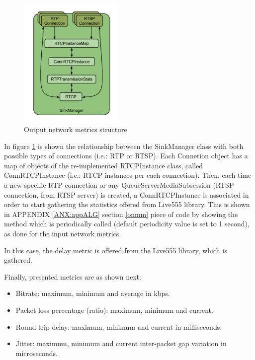 \begin{figure}[!htb]
\begin{center}
\includegraphics[width=0.45\textwidth]{./images/SinkManager.png}
\caption{Output network metrics structure}
\label{F:onms}
\end{center}
\end{figure}

In figure \ref{F:onms} is shown the relationship between the SinkManager class with both possible types of connections (i.e.: RTP or RTSP). Each Connetion object has a map of objects of the re-implemented RTCPInstance class, called ConnRTCPInstance (i.e.: RTCP instances per each connection). Then, each time a new specific RTP connection or any QueueServerMediaSubsession (RTSP connection, from RTSP server) is created, a ConnRTCPInstance is associated in order to start gathering the statistics offered from Live555 library. This is shown in APPENDIX \ref{ANX:appALG} section \ref{onmm} piece of code by showing the method which is periodically called (default periodicity value is set to 1 second), as done for the input network metrics.

In this case, the delay metric is offered from the Live555 library, which is gathered.

Finally, presented metrics are as shown next:

\begin{itemize}
\item Bitrate: maximum, minimum and average in kbps.
\item Packet loss percentage (ratio): maximum, minimum and current.
\item Round trip delay: maximum, minimum and current in milliseconds.
\item Jitter: maximum, minimum and current inter-packet gap variation in microseconds.
\end{itemize}

